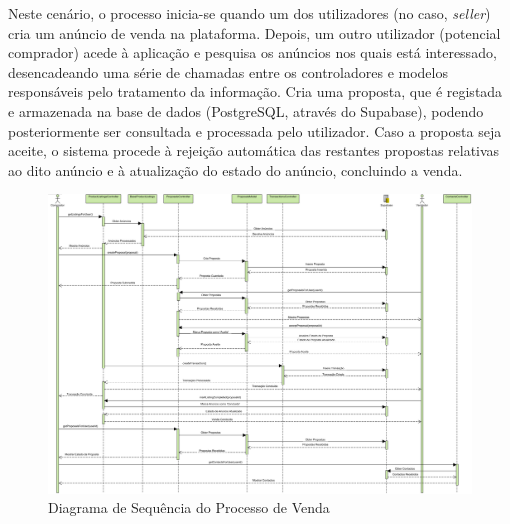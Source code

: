 \documentclass[a4paper, 12pt]{article} %
\begin{document}
Neste cenário, o processo inicia-se quando um dos utilizadores (no caso, \textit{seller}) cria um anúncio de venda na plataforma. Depois, um outro utilizador (potencial comprador) acede à aplicação e pesquisa os anúncios nos quais está interessado, desencadeando uma série de chamadas entre os controladores e modelos responsáveis pelo tratamento da informação. Cria uma proposta, que é registada e armazenada na base de dados (PostgreSQL, através do Supabase), podendo posteriormente ser consultada e processada pelo utilizador. Caso a proposta seja aceite, o sistema procede à rejeição automática das restantes propostas relativas ao dito anúncio e à atualização do estado do anúncio, concluindo a venda.
\newpage
	\begin{figure}[H]
		\centering
		\includegraphics[width=\textwidth,height=\textheight,keepaspectratio]{../images/sequence-diagram-sale.png}
		\caption{Diagrama de Sequência do Processo de Venda}
		\label{fig:diagrama_sequencia_venda}
	\end{figure}

\newpage
\end{document}
